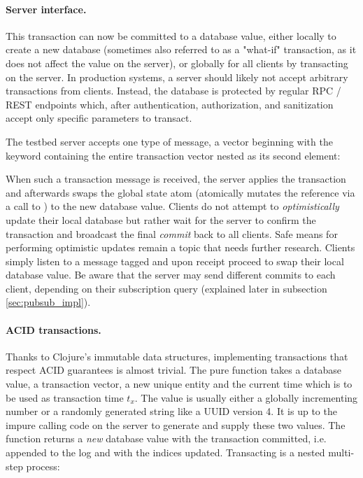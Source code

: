 \paragraph{Server interface.}
This transaction can now be committed to a database value, either locally to create a new database (sometimes also referred to as a "what-if" transaction, as it does not affect the value on the server), or globally for all clients by transacting on the server. In production systems, a server should likely not accept arbitrary transactions from clients. Instead, the database is protected by regular \gls{RPC} / REST endpoints which, after authentication, authorization, and sanitization accept only specific parameters to transact.

The testbed server accepts one type of message, a vector beginning with the keyword  containing the entire transaction vector nested as its second element:

\begin{center}
\end{center}

When such a transaction message is received, the server applies the transaction and afterwards swaps the global state atom (atomically mutates the reference via a call to ) to the new database value. Clients do not attempt to \emph{optimistically} update their local database but rather wait for the server to confirm the transaction and broadcast the final \emph{commit} back to all clients. Safe means for performing optimistic updates remain a topic that needs further research. Clients simply listen to a message tagged  and upon receipt proceed to swap their local database value. Be aware that the server may send different commits to each client, depending on their subscription query (explained later in subsection \ref{sec:pubsub_impl}).

\paragraph{ACID transactions.}
Thanks to Clojure's immutable data structures, implementing transactions that respect \gls{ACID} guarantees is almost trivial.
The pure function  takes a database value, a transaction vector, a new unique entity  and the current time which is to be used as transaction time $t_x$. The  value is usually either a globally incrementing number or a randomly generated string like a \gls{UUID} version 4. It is up to the impure calling code on the server to generate and supply these two values. The  function returns a \emph{new} database value with the transaction committed, i.e. appended to the log and with the indices updated. Transacting is a nested multi-step process:

